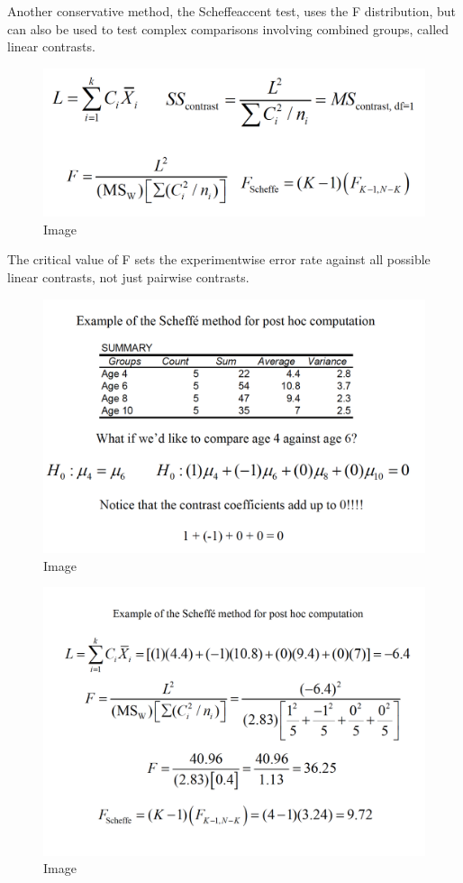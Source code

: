 \documentclass[]{book}
\theoremstyle{definition}
\theoremstyle{definition}
\theoremstyle{definition}
\theoremstyle{remark}
\begin{document}
Another conservative method, the Scheffeaccent test, uses the F
distribution, but can also be used to test complex comparisons involving
combined groups, called linear contrasts.

\begin{figure}
\centering
\includegraphics{img/hicksphc10.png}
\caption{Image}
\end{figure}

The critical value of F sets the experimentwise error rate against all
possible linear contrasts, not just pairwise contrasts.

\begin{figure}
\centering
\includegraphics{img/hicksphc11.png}
\caption{Image}
\end{figure}

\begin{figure}
\centering
\includegraphics{img/hicksphc12.png}
\caption{Image}
\end{figure}
\end{document}
